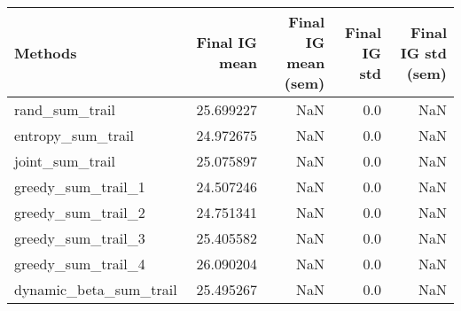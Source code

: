 \begin{tabular}{lrrrr}
\toprule
                Methods &  Final IG mean &  Final IG mean (sem) &  Final IG std &  Final IG std (sem) \\
\midrule
         rand\_sum\_trail &      25.699227 &                  NaN &           0.0 &                 NaN \\
      entropy\_sum\_trail &      24.972675 &                  NaN &           0.0 &                 NaN \\
        joint\_sum\_trail &      25.075897 &                  NaN &           0.0 &                 NaN \\
     greedy\_sum\_trail\_1 &      24.507246 &                  NaN &           0.0 &                 NaN \\
     greedy\_sum\_trail\_2 &      24.751341 &                  NaN &           0.0 &                 NaN \\
     greedy\_sum\_trail\_3 &      25.405582 &                  NaN &           0.0 &                 NaN \\
     greedy\_sum\_trail\_4 &      26.090204 &                  NaN &           0.0 &                 NaN \\
 dynamic\_beta\_sum\_trail &      25.495267 &                  NaN &           0.0 &                 NaN \\
\bottomrule
\end{tabular}

